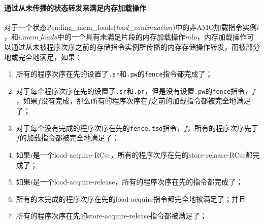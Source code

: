 \paragraph{通过从未传播的状态转发来满足内存加载操作}\label{omm:sat_by_forwarding}
对于一个状态{\sc Pending\_mem\_loads}({\it load\_continuation})中的非AMO加载指令实例$i$，和$i.\textit{mem\_loads}$中的一个具有未满足片段的内存加载操作$mlo$，内存加载操作可以通过从未被程序次序之前的存储指令实例所传播的内存存储操作转发，而被部分地或完全地满足，如果：
\begin{enumerate}
\item 所有的程序次序在先的设置了{\tt .sr}和{\tt .pw}的{\tt fence}指令都完成了；  %
\item 对于每个程序次序在先的设置了{\tt .sr}和{\tt .pr}，但是没有设置{\tt .pw}的{\tt fence}指令，$f$，如果$f$没有完成，那么所有的程序次序在$f$之前的加载指令都被完全地满足了；  %
\item 对于每个没有完成的程序次序在先的{\tt fence.tso}指令，$f$，所有的程序次序先于$f$的加载指令都被完全地满足了；  %
\item 如果$i$是一个load-acquire-RCsc，所有的程序次序在先的store-relaase-RCsc都完成了；  %
\item 如果$i$是一个load-acquire-release，所有的程序次序在先的指令都完成了；  %
\item 所有的未完成的程序次序在先的load-acquire指令都完全地被满足了；并且  %
\item 所有的程序次序在先的store-acquire-release指令都被满足了；  %
\end{enumerate}

